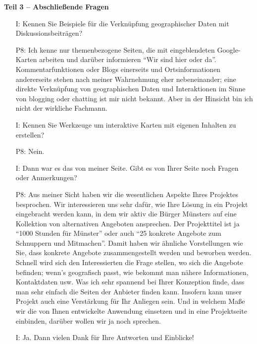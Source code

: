 \textbf{Teil 3 -- Abschlie{\ss}ende Fragen}
\begin{itemize}
    \item[I:] Kennen Sie Beispiele f{\"u}r die Verkn{\"u}pfung geographischer Daten mit Diskussionsbeitr{\"a}gen?
    \item[P8:] Ich kenne nur themenbezogene Seiten, die mit eingeblendeten Google-Karten arbeiten und dar{\"u}ber informieren "`Wir sind hier oder da"'. Kommentarfunktionen oder Blogs einerseits und Ortsinformationen andererseits stehen nach meiner Wahrnehmung eher nebeneinander; eine direkte Verkn{\"u}pfung von geographischen Daten und Interaktionen im Sinne von blogging oder chatting ist mir nicht bekannt. Aber in der Hinsicht bin ich nicht der wirkliche Fachmann.
    \item[I:] Kennen Sie Werkzeuge um interaktive Karten mit eigenen Inhalten zu erstellen?
    \item[P8:] Nein.
    \item[I:] Dann war es das von meiner Seite. Gibt es von Ihrer Seite noch Fragen oder Anmerkungen?
    \item[P8:] Aus meiner Sicht haben wir die wesentlichen Aspekte Ihres Projektes besprochen. Wir interessieren uns sehr daf{\"u}r, wie Ihre L{\"o}sung in ein Projekt eingebracht werden kann, in dem wir aktiv die B{\"u}rger M{\"u}nsters auf eine Kollektion von alternativen Angeboten ansprechen. Der Projekttitel ist ja "`1000 Stunden f{\"u}r M{\"u}nster"' oder auch "`25 konkrete Angebote zum Schnuppern und Mitmachen"'. Damit haben wir {\"a}hnliche Vorstellungen wie Sie, dass konkrete Angebote zusammengestellt werden und beworben werden. Schnell wird sich den Interessierten die Frage stellen, wo sich die Angebote befinden; wenn's geografisch passt, wie bekommt man n{\"a}here Informationen, Kontaktdaten usw. Was ich sehr spannend bei Ihrer Konzeption finde, dass man sehr einfach die Seiten der Anbieter finden kann. Insofern kann unser Projekt auch eine Verst{\"a}rkung f{\"u}r Ihr Anliegen sein. Und in welchem Ma{\ss}e wir die von Ihnen entwickelte Anwendung einsetzen und in eine Projektseite einbinden, dar{\"u}ber wollen wir ja noch sprechen.
    \item[I:] Ja. Dann vielen Dank f{\"u}r Ihre Antworten und Einblicke!
\end{itemize}